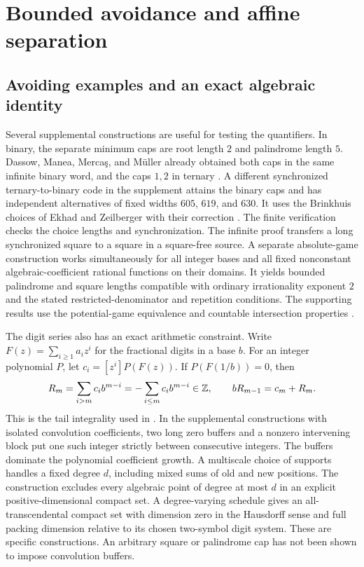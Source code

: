 \section{Bounded avoidance and affine separation}\label{sec:construct}

\subsection{Avoiding examples and an exact algebraic identity}
Several supplemental constructions are useful for testing the quantifiers. In binary, the separate minimum caps are root length $2$ and palindrome length $5$. Dassow, Manea, Merca\c{s}, and M\"uller already obtained both caps in the same infinite binary word, and the caps $1,2$ in ternary \cite[Theorems 4 and 5]{DMMM}. A different synchronized ternary-to-binary code in the supplement attains the binary caps and has independent alternatives of fixed widths $605$, $619$, and $630$. It uses the Brinkhuis choices of Ekhad and Zeilberger with their correction \cite{EZ}. The finite verification checks the choice lengths and synchronization. The infinite proof transfers a long synchronized square to a square in a square-free source. A separate absolute-game construction works simultaneously for all integer bases and all fixed nonconstant algebraic-coefficient rational functions on their domains. It yields bounded palindrome and square lengths compatible with ordinary irrationality exponent $2$ and the stated restricted-denominator and repetition conditions. The supporting results use the potential-game equivalence and countable intersection properties \cite{FSU,BNY}.

The digit series also has an exact arithmetic constraint. Write $F(z)=\sum_{i\ge1}a_i z^i$ for the fractional digits in a base $b$. For an integer polynomial $P$, let $c_i=[z^i]P(F(z))$. If $P(F(1/b))=0$, then
\[
 R_m=\sum_{i>m}c_i b^{m-i}=-\sum_{i\le m}c_i b^{m-i}\in\mathbb Z,
 \qquad b R_{m-1}=c_m+R_m .
\]
This is the tail integrality used in \cite{BBCP}. In the supplemental constructions with isolated convolution coefficients, two long zero buffers and a nonzero intervening block put one such integer strictly between consecutive integers. The buffers dominate the polynomial coefficient growth. A multiscale choice of supports handles a fixed degree $d$, including mixed sums of old and new positions. The construction excludes every algebraic point of degree at most $d$ in an explicit positive-dimensional compact set. A degree-varying schedule gives an all-transcendental compact set with dimension zero in the Hausdorff sense and full packing dimension relative to its chosen two-symbol digit system. These are specific constructions. An arbitrary square or palindrome cap has not been shown to impose convolution buffers.

